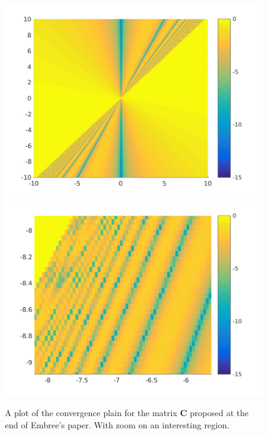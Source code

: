 \begin{figure}
\centering
\includegraphics[width=0.45\linewidth]{../src/figure/twoDPaper}
\includegraphics[width=0.45\linewidth]{../src/figure/twoDZoom}
\caption{A plot of the convergence plain for the matrix $\mathbf{C}$ proposed at the end of Embree's paper. With zoom on an interesting region.}
\label{fig:twoDZoom}
\end{figure}




